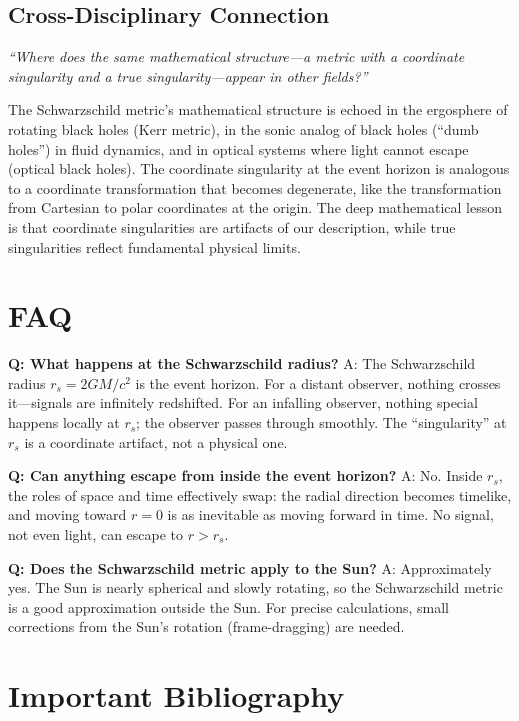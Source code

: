 \documentclass[11pt,openright]{book}
\begin{document}
\subsection*{Cross-Disciplinary Connection}
\textit{``Where does the same mathematical structure---a metric with a coordinate singularity and a true singularity---appear in other fields?''}

The Schwarzschild metric's mathematical structure is echoed in the ergosphere of rotating black holes (Kerr metric), in the sonic analog of black holes (``dumb holes'') in fluid dynamics, and in optical systems where light cannot escape (optical black holes). The coordinate singularity at the event horizon is analogous to a coordinate transformation that becomes degenerate, like the transformation from Cartesian to polar coordinates at the origin. The deep mathematical lesson is that coordinate singularities are artifacts of our description, while true singularities reflect fundamental physical limits.

\section*{FAQ}

\textbf{Q: What happens at the Schwarzschild radius?}
A: The Schwarzschild radius $r_s = 2GM/c^2$ is the event horizon. For a distant observer, nothing crosses it---signals are infinitely redshifted. For an infalling observer, nothing special happens locally at $r_s$; the observer passes through smoothly. The ``singularity'' at $r_s$ is a coordinate artifact, not a physical one.

\textbf{Q: Can anything escape from inside the event horizon?}
A: No. Inside $r_s$, the roles of space and time effectively swap: the radial direction becomes timelike, and moving toward $r = 0$ is as inevitable as moving forward in time. No signal, not even light, can escape to $r > r_s$.

\textbf{Q: Does the Schwarzschild metric apply to the Sun?}
A: Approximately yes. The Sun is nearly spherical and slowly rotating, so the Schwarzschild metric is a good approximation outside the Sun. For precise calculations, small corrections from the Sun's rotation (frame-dragging) are needed.
\section*{Important Bibliography}
\end{document}
